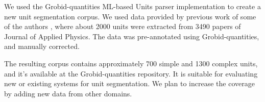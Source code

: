 \documentclass[a4,11pt]{article}
\begin{document}
We used the Grobid-quantities ML-based Units parser implementation to create a new unit segmentation corpus. We used data provided by previous work of some of the authors \autocite{suzuki2018constructing}, where about 2000 units were extracted from 3490 papers of Journal of Applied Physics. The data was pre-annotated using Grobid-quantities, and manually corrected. 

The resulting corpus contains approximately 700 simple and 1300 complex units, and it's available at the Grobid-quantities repository\footnotemark[3]. It is suitable for evaluating new or existing systems for unit segmentation. We plan to increase the coverage by adding new data from other domains.
\end{document}
